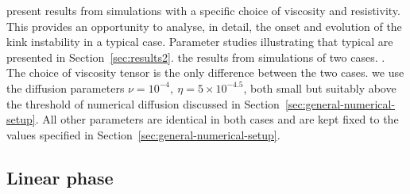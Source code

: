  present results from simulations with a
specific choice of viscosity and resistivity. This provides an
opportunity to analyse, in detail, the onset and evolution of the kink
instability in a typical case. Parameter studies illustrating that
 typical are presented 
in Section~\ref{sec:results2}.
 the results from simulations of two
cases. . The choice of viscosity
tensor is the only difference between the two cases.  we use the diffusion parameters $\nu = 10^{-4},\ \eta =
5\times 10^{-4.5}$, both small but suitably above the threshold of
numerical diffusion discussed in
Section~\ref{sec:general-numerical-setup}.  All other parameters are
identical in both cases and are kept fixed to the values specified in
Section~\ref{sec:general-numerical-setup}. 

\subsection{Linear phase}

